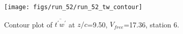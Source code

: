 \begin{figure}[H]
\centering
\texttt{[image: figs/run\_52/run\_52\_tw\_contour]}
\caption{Contour plot of $\overline{t^\prime w^\prime}$ at $z/c$=9.50, $V_{free}$=17.36, station 6.}
\end{figure}


